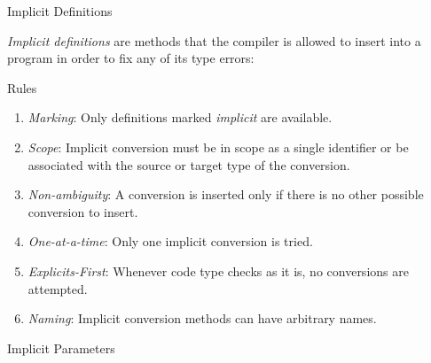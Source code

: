 \documentclass[serif,t,11pt]{beamer}
\begin{document}
\begin{frame}{Implicit Definitions}

\emph{Implicit definitions} are methods that the compiler is allowed to insert into a program in order to fix any of its type errors: 
\begin{center}
\end{center}

\pause

\begin{alertblock}{Rules}
\begin{enumerate}
\item \emph{Marking}: Only definitions marked \emph{implicit} are available.
\item \emph{Scope}: Implicit conversion must be in scope as a single identifier or be associated with the source or target type of the conversion.%
\item \emph{Non-ambiguity}: A conversion is inserted only if there is no other possible conversion to insert.
\item \emph{One-at-a-time}: Only one implicit conversion is tried.
\item \emph{Explicits-First}: Whenever code type checks as it is, no conversions are attempted.
\item \emph{Naming}: Implicit conversion methods can have arbitrary names.
\end{enumerate}
\end{alertblock}

\end{frame}

\begin{frame}{Implicit Parameters}



\end{frame}
\end{document}
